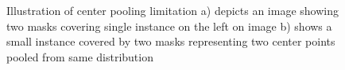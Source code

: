 \begin{figure}[H] %
    \caption[Dual Center Pooling Illustration] {Illustration of center pooling limitation a) depicts an image showing two masks covering single instance on the left on image b) shows a small instance covered by two masks representing two center points pooled from same distribution }
    \label{fig:failurecaseexamples}
\end{figure}




